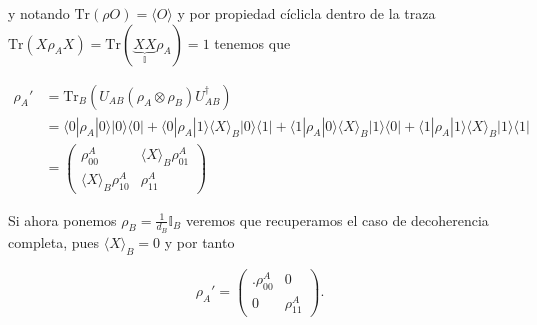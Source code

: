 \documentclass[12pt]{article}
\makeatletter
\theoremstyle{definition}\@ifundefined{exercise}{\newtheorem{exercise}{Ejercicio}}{}%
\makeatother
\begin{document}
y notando $\text{Tr}(\rho O)=\langle O \rangle$ y por propiedad cíclicla dentro de la traza $\text{Tr}(X\rho_A X)=\text{Tr}(\underbrace{XX}_{\mathbb{I}}\rho_A)=1$ tenemos que

\begin{align*}
  \rho_A' &=  \text{Tr}_B(U_{AB}(\rho_A \otimes \rho_B)U_{AB}^{\dagger}) \\
   &= \langle0|\rho_A|0\rangle |0\rangle\langle0|  + \langle0|\rho_A|1\rangle \langle X \rangle_B |0\rangle\langle1| + \langle1|\rho_A|0\rangle \langle X \rangle_B |1\rangle\langle0| + \langle1|\rho_A|1\rangle \langle X \rangle_B |1\rangle\langle1| \\
   &= \begin{pmatrix}
    \rho^{A}_{00} & \langle X \rangle_B \rho^{A}_{01} \\
    \langle X \rangle_B \rho^{A}_{10} & \rho^{A}_{11}
    \end{pmatrix}
\end{align*}

Si ahora ponemos $\rho_B = \frac{1}{d_B}\mathbb{I}_B$ veremos que recuperamos el caso de decoherencia completa, pues $\langle X \rangle_B = 0$ y por tanto 

$$\rho_A' = \begin{pmatrix}.
    \rho^{A}_{00} & 0 \\
    0 & \rho^{A}_{11}
    \end{pmatrix}.$$
\end{document}

